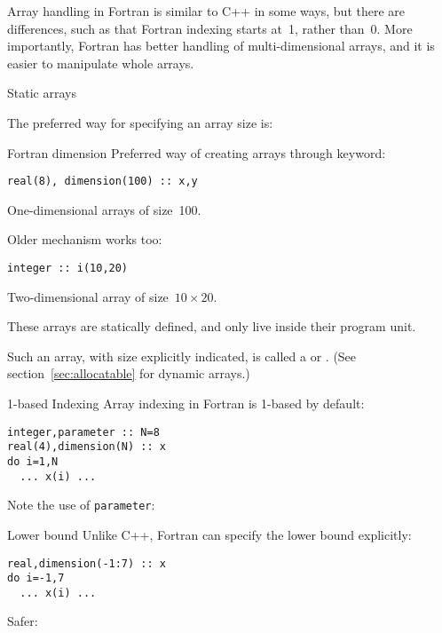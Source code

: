 
Array handling in Fortran is similar to C++ in some ways, but there
are differences, such as that  Fortran indexing starts at~1, rather
than~0. More importantly, Fortran has better handling of
multi-dimensional arrays, and it is easier to manipulate whole arrays.

 {Static arrays}

The preferred way for specifying an array size is:

\begin{block}{Fortran dimension}
  \label{sl:farray-dimension}
Preferred way of creating arrays through 
keyword:
\begin{lstlisting}
real(8), dimension(100) :: x,y
\end{lstlisting}
One-dimensional arrays of size~100.

Older mechanism works too:
\begin{lstlisting}
integer :: i(10,20)
\end{lstlisting}
Two-dimensional array of size~$10\times 20$.

These arrays are statically defined, and only live inside their
program unit.
\end{block}

Such an array, with size explicitly indicated, is called a
 or .
(See section~\ref{sec:allocatable} for
dynamic arrays.)

\begin{block}{1-based Indexing}
  \label{sl:farray-base1}
Array indexing in Fortran is 1-based by default:
\begin{lstlisting}
integer,parameter :: N=8
real(4),dimension(N) :: x
do i=1,N
  ... x(i) ...
\end{lstlisting}
Note the use of \lstinline{parameter}:
\end{block}

\begin{block}{Lower bound}
  \label{sl:farray-lower}
Unlike C++, Fortran can specify the lower bound explicitly:
\begin{lstlisting}
real,dimension(-1:7) :: x
do i=-1,7
  ... x(i) ...
\end{lstlisting}
Safer:
\end{block}

